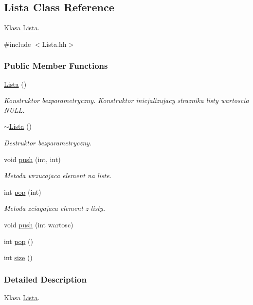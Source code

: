 \hypertarget{a00003}{\subsection{Lista Class Reference}
\label{a00003}
}


Klasa \hyperlink{a00003}{Lista}.  




{\ttfamily \#include $<$Lista.\-hh$>$}

\subsubsection*{Public Member Functions}
\begin{DoxyCompactItemize}
\item 
\hyperlink{a00003_a1f668b36909182ef1360b48503529a31}{Lista} ()
\begin{DoxyCompactList}\small\item\em Konstruktor bezparametryczny. Konstruktor inicjalizujacy straznika listy wartoscia N\-U\-L\-L. \end{DoxyCompactList}\item 
\hyperlink{a00003_a4d7394b2728a00ad8404965b2e15d096}{$\sim$\-Lista} ()
\begin{DoxyCompactList}\small\item\em Destruktor bezparametryczny. \end{DoxyCompactList}\item 
void \hyperlink{a00003_af13f329882aeacf6dd1ad28b014f2c41}{push} (int, int)
\begin{DoxyCompactList}\small\item\em Metoda wrzucajaca element na liste. \end{DoxyCompactList}\item 
int \hyperlink{a00003_acaf8411473b2118c8f54272a58aae14d}{pop} (int)
\begin{DoxyCompactList}\small\item\em Metoda zciagajaca element z listy. \end{DoxyCompactList}\item 
void \hyperlink{a00003_a4e00c7aa7ab1918d4f282f610f47a164}{push} (int wartosc)
\item 
int \hyperlink{a00003_ad4905f890e73715d783a197a51aee985}{pop} ()
\item 
int \hyperlink{a00003_a3836382e3cf53b6ea281937d045d181c}{size} ()
\end{DoxyCompactItemize}


\subsubsection{Detailed Description}
Klasa \hyperlink{a00003}{Lista}. 

